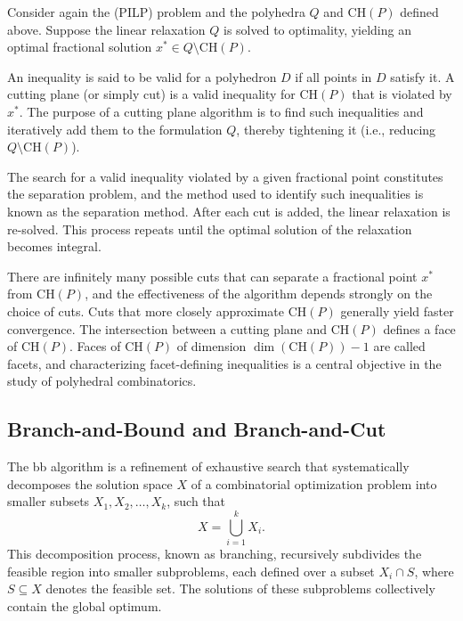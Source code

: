 Consider again the (PILP) problem and the polyhedra $Q$ and $\text{CH}(P)$ defined above. Suppose the linear relaxation $Q$ is solved to optimality, yielding an optimal fractional solution $x^* \in Q \setminus \text{CH}(P)$.

An inequality is said to be valid for a polyhedron $D$ if all points in $D$ satisfy it. A cutting plane (or simply cut) is a valid inequality for $\text{CH}(P)$ that is violated by $x^*$. The purpose of a cutting plane algorithm is to find such inequalities and iteratively add them to the formulation $Q$, thereby tightening it (i.e., reducing $Q \setminus \text{CH}(P)$).

The search for a valid inequality violated by a given fractional point constitutes the separation problem, and the method used to identify such inequalities is known as the separation method. After each cut is added, the linear relaxation is re-solved. This process repeats until the optimal solution of the relaxation becomes integral.

There are infinitely many possible cuts that can separate a fractional point $x^*$ from $\text{CH}(P)$, and the effectiveness of the algorithm depends strongly on the choice of cuts. Cuts that more closely approximate $\text{CH}(P)$ generally yield faster convergence. The intersection between a cutting plane and $\text{CH}(P)$ defines a face of $\text{CH}(P)$. Faces of $\text{CH}(P)$ of dimension $\dim(\text{CH}(P)) - 1$ are called facets, and characterizing facet-defining inequalities is a central objective in the study of polyhedral combinatorics.

\subsection{Branch-and-Bound and Branch-and-Cut}\label{sec:branch-and-bound-and-branch-and-cut}

The \gls{bb} algorithm is a refinement of exhaustive search that systematically decomposes the solution space $X$ of a combinatorial optimization problem into smaller subsets $X_1, X_2, \ldots, X_k$, such that
\begin{equation}
	X = \bigcup_{i=1}^{k} X_i.
\end{equation}
This decomposition process, known as branching, recursively subdivides the feasible region into smaller subproblems, each defined over a subset $X_i \cap S$, where $S \subseteq X$ denotes the feasible set. The solutions of these subproblems collectively contain the global optimum.

